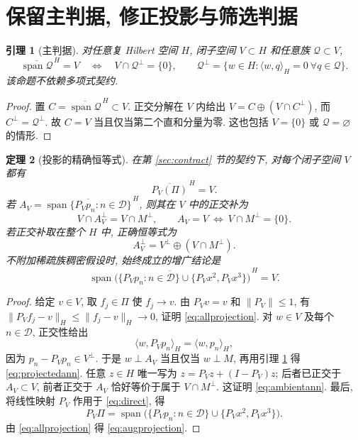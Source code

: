\documentclass[UTF8,11pt]{ctexart}
\newtheorem{theorem}{定理}[section]
\newtheorem{lemma}[theorem]{引理}
\theoremstyle{definition}
\DeclareMathOperator{\Span}{span}
\newcommand{\ip}[2]{\langle #1,#2\rangle_H}
\newcommand{\clspan}[1]{\overline{\Span #1}^{\,H}}
\newcommand{\D}{\mathcal D}
\newcommand{\Q}{\mathcal Q}
\begin{document}
\section{保留主判据, 修正投影与筛选判据}\label{sec:projection}

\begin{lemma}[主判据]\label{lem:master}
对任意复 Hilbert 空间 $H$, 闭子空间 $V\subset H$ 和任意族 $\Q\subset V$,
\begin{equation}\label{eq:master}
 \clspan{\Q}=V\quad\Longleftrightarrow\quad V\cap\Q^\perp=\{0\},
 \qquad \Q^\perp=\{w\in H:\ip{w}{q}=0\ \forall q\in\Q\}.
\end{equation}
该命题不依赖多项式契约.
\end{lemma}
\begin{proof}
置 $C=\clspan{\Q}\subset V$. 正交分解在 $V$ 内给出
$V=C\oplus(V\cap C^\perp)$, 而 $C^\perp=\Q^\perp$.
故 $C=V$ 当且仅当第二个直和分量为零.
这也包括 $V=\{0\}$ 或 $\Q=\varnothing$ 的情形.
\end{proof}

\begin{theorem}[投影的精确恒等式]\label{thm:projection}
在第 \ref{sec:contract} 节的契约下, 对每个闭子空间 $V$ 都有
\begin{equation}\label{eq:allprojection}
 \overline{P_V(\Pi)}^{\,H}=V.
\end{equation}
若 $A_V=\clspan{\{P_Vp_n:n\in\D\}}$, 则其在 $V$ 中的正交补为
\begin{equation}\label{eq:projectedann}
 V\cap A_V^\perp=V\cap M^\perp,
 \qquad A_V=V\ \Longleftrightarrow\ V\cap M^\perp=\{0\}.
\end{equation}
若正交补取在整个 $H$ 中, 正确恒等式为
\begin{equation}\label{eq:ambientann}
 A_V^\perp=V^\perp\oplus(V\cap M^\perp).
\end{equation}
不附加稀疏族稠密假设时, 始终成立的增广结论是
\begin{equation}\label{eq:augprojection}
 \clspan{\bigl(\{P_Vp_n:n\in\D\}\cup\{P_Vx^2,P_Vx^3\}\bigr)}=V.
\end{equation}
\end{theorem}

\begin{proof}
给定 $v\in V$, 取 $f_j\in\Pi$ 使 $f_j\to v$.
由 $P_Vv=v$ 和 $\|P_V\|\leq1$, 有
$\|P_Vf_j-v\|_H\leq\|f_j-v\|_H\to0$, 证明 \eqref{eq:allprojection}.
对 $w\in V$ 及每个 $n\in\D$, 正交性给出
\begin{equation}\label{eq:pairprojection}
 \ip{w}{P_Vp_n}=\ip{w}{p_n},
\end{equation}
因为 $p_n-P_Vp_n\in V^\perp$. 于是 $w\perp A_V$ 当且仅当 $w\perp M$,
再用引理 \ref{lem:master} 得 \eqref{eq:projectedann}.
任意 $z\in H$ 唯一写为 $z=P_Vz+(I-P_V)z$;
后者已正交于 $A_V\subset V$, 前者正交于 $A_V$ 恰好等价于属于 $V\cap M^\perp$.
这证明 \eqref{eq:ambientann}.
最后, 将线性映射 $P_V$ 作用于 \eqref{eq:direct}, 得
\[
 P_V\Pi=\Span\bigl(\{P_Vp_n:n\in\D\}\cup\{P_Vx^2,P_Vx^3\}\bigr).
\]
由 \eqref{eq:allprojection} 得 \eqref{eq:augprojection}.
\end{proof}
\end{document}
